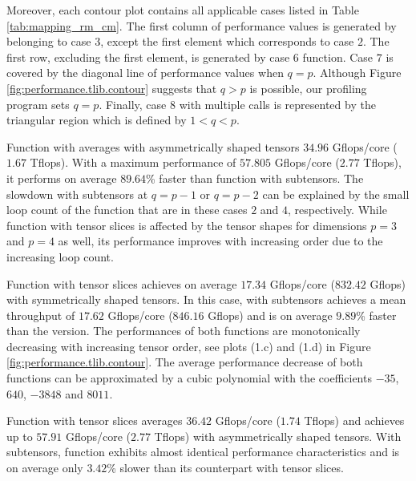 Moreover, each contour plot contains all applicable  cases listed in Table \ref{tab:mapping_rm_cm}.
The first column of performance values is generated by  belonging to case $3$, except the first element which corresponds to case $2$.
The first row, excluding the first element, is generated by case $6$ function.
Case $7$ is covered by the diagonal line of performance values when $q = p$.  
Although Figure \ref{fig:performance.tlib.contour} suggests that $q>p$ is possible, our profiling program sets $q=p$.
Finally, case $8$ with multiple  calls is represented by the triangular region which is defined by $1<q<p$.


Function  with  averages with asymmetrically shaped tensors $34.96$ Gflops/core ($1.67$ Tflops).
With a maximum performance of $57.805$ Gflops/core ($2.77$ Tflops), it performs on average $89.64$\% faster than function  with subtensors.
The slowdown with subtensors at $q=p-1$ or $q=p-2$ can be explained by the small loop count of the function that are in these cases $2$ and $4$, respectively.
While function  with tensor slices is affected by the tensor shapes for dimensions $p=3$ and $p=4$ as well, its performance improves with increasing order due to the increasing loop count.

Function  with tensor slices achieves on average $17.34$ Gflops/core ($832.42$ Gflops) with symmetrically shaped tensors.
In this case,  with subtensors achieves a mean throughput of $17.62$ Gflops/core ($846.16$ Gflops) and is on average $9.89$\% faster than the  version.
The performances of both functions are monotonically decreasing with increasing tensor order, see plots (1.c) and (1.d) in Figure \ref{fig:performance.tlib.contour}.
The average performance decrease of both functions can be approximated by a cubic polynomial with the coefficients $-35$, $640$, $-3848$ and $8011$.

Function  with tensor slices averages $36.42$ Gflops/core ($1.74$ Tflops) and achieves up to $57.91$ Gflops/core ($2.77$ Tflops) with asymmetrically shaped tensors.
With subtensors, function  exhibits almost identical performance characteristics and is on average only $3.42$\% slower than its counterpart with tensor slices.

